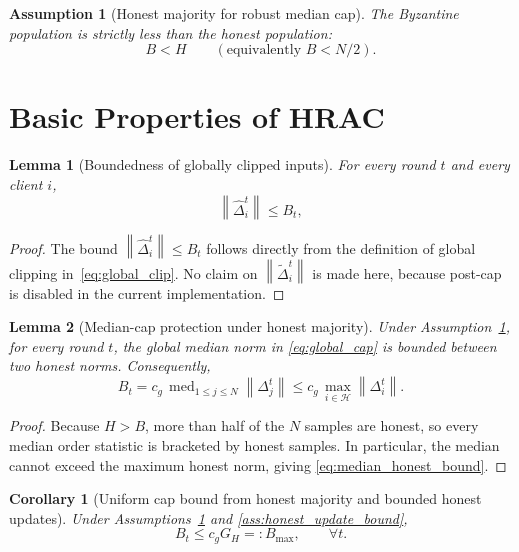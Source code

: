 \documentclass[11pt,a4paper]{article}
\newtheorem{assumption}{Assumption}
\newtheorem{lemma}{Lemma}
\newtheorem{corollary}{Corollary}
\theoremstyle{remark}
\newcommand{\HH}{\mathcal{H}}
\newcommand{\med}{\operatorname{med}}
\newcommand{\norm}[1]{\left\lVert #1 \right\rVert}
\begin{document}
\begin{assumption}[Honest majority for robust median cap]
\label{ass:honest_majority}
The Byzantine population is strictly less than the honest population:
\begin{equation}
    B < H
    \qquad(\text{equivalently } B < N/2).
    \label{eq:honest_majority}
\end{equation}
\end{assumption}

\section{Basic Properties of HRAC}

\begin{lemma}[Boundedness of globally clipped inputs]
\label{lem:bounded}
For every round \(t\) and every client \(i\),
\begin{equation}
    \norm{\hat{\Delta}_i^t} \le B_t,
    \label{eq:uniform_bound}
\end{equation}
\end{lemma}

\begin{proof}
The bound \(\norm{\hat{\Delta}_i^t} \le B_t\) follows directly from the
definition of global clipping in~\eqref{eq:global_clip}.
No claim on \(\norm{\tilde{\Delta}_i^t}\) is made here, because post-cap is
disabled in the current implementation.
\end{proof}

\begin{lemma}[Median-cap protection under honest majority]
\label{lem:median_cap_honest}
Under Assumption~\ref{ass:honest_majority}, for every round \(t\), the global
median norm in \eqref{eq:global_cap} is bounded between two honest norms.
Consequently,
\begin{equation}
    B_t
    =
    c_g\,\med_{1\le j\le N}\norm{\Delta_j^t}
    \le
    c_g\,\max_{i\in\HH}\norm{\Delta_i^t}.
    \label{eq:median_honest_bound}
\end{equation}
\end{lemma}

\begin{proof}
Because \(H>B\), more than half of the \(N\) samples are honest, so every
median order statistic is bracketed by honest samples. In particular, the
median cannot exceed the maximum honest norm, giving
\eqref{eq:median_honest_bound}.
\end{proof}

\begin{corollary}[Uniform cap bound from honest majority and bounded honest updates]
\label{cor:Bmax_from_honest}
Under Assumptions~\ref{ass:honest_majority} and
\ref{ass:honest_update_bound},
\begin{equation}
    B_t
    \le
    c_g G_H
    =: B_{\max},
    \qquad \forall t.
    \label{eq:Bmax_from_honest}
\end{equation}
\end{corollary}
\end{document}
